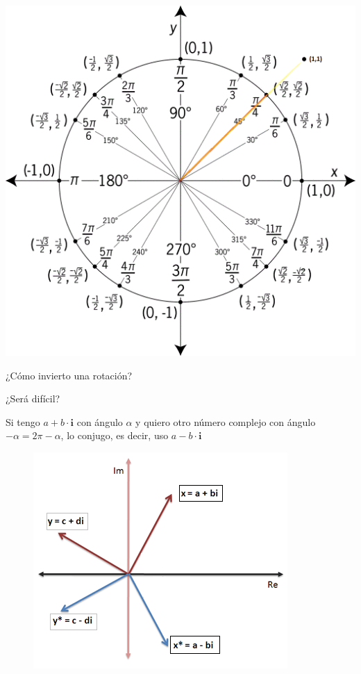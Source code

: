 \documentclass[10pt]{beamer}
\begin{document}
\begin{frame}

\includegraphics[scale=0.35]{unit_circle.png}

\end{frame}

\begin{frame}{¿Cómo invierto una rotación?}

¿Será difícil? 

Si tengo $a+b\cdot \textbf{i}$ con ángulo $\alpha$ y quiero otro número complejo con ángulo $-\alpha = 2\pi - \alpha$, lo conjugo, es decir, uso $a-b\cdot\textbf{i}$

\begin{figure}
\centering
\includegraphics[scale=0.7]{conjugado.png}
\end{figure}


\end{frame}
\end{document}
